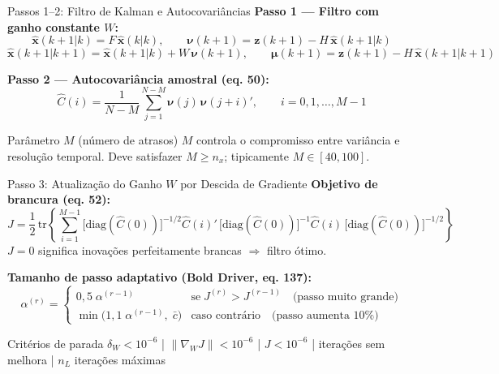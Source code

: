 \documentclass[aspectratio=169]{beamer}
\begin{document}
\begin{frame}{Passos 1--2: Filtro de Kalman e Autocovariâncias}
    \textbf{Passo 1 — Filtro com ganho constante $W$:}
    \[
        \hat{\mathbf{x}}(k{+}1|k) = F\,\hat{\mathbf{x}}(k|k), \qquad
        \boldsymbol{\nu}(k{+}1) = \mathbf{z}(k{+}1) - H\,\hat{\mathbf{x}}(k{+}1|k)
    \]
    \[
        \hat{\mathbf{x}}(k{+}1|k{+}1) = \hat{\mathbf{x}}(k{+}1|k) + W\,\boldsymbol{\nu}(k{+}1), \qquad
        \boldsymbol{\mu}(k{+}1) = \mathbf{z}(k{+}1) - H\,\hat{\mathbf{x}}(k{+}1|k{+}1)
    \]

    \vspace{0.3cm}
    \textbf{Passo 2 — Autocovariância amostral (eq. 50):}
    \[
        \hat{C}(i) = \frac{1}{N-M}\sum_{j=1}^{N-M}\boldsymbol{\nu}(j)\,\boldsymbol{\nu}(j{+}i)',
        \qquad i = 0,1,\ldots,M{-}1
    \]

    \begin{alertblock}{Parâmetro $M$ (número de atrasos)}
        $M$ controla o compromisso entre variância e resolução temporal.
        Deve satisfazer $M \geq n_x$; tipicamente $M \in [40, 100]$.
    \end{alertblock}
\end{frame}

\begin{frame}{Passo 3: Atualização do Ganho $W$ por Descida de Gradiente}
    \textbf{Objetivo de brancura (eq. 52):}
    \[
        J = \frac{1}{2}\,\text{tr}\!\left\{
            \sum_{i=1}^{M-1}
            \bigl[\text{diag}(\hat{C}(0))\bigr]^{-1/2}
            \hat{C}(i)'\,
            \bigl[\text{diag}(\hat{C}(0))\bigr]^{-1}
            \hat{C}(i)\,
            \bigl[\text{diag}(\hat{C}(0))\bigr]^{-1/2}
        \right\}
    \]
    $J = 0$ significa inovações perfeitamente brancas $\Rightarrow$ filtro ótimo.

    \vspace{0.2cm}
    \textbf{Tamanho de passo adaptativo (Bold Driver, eq. 137):}
    \[
        \alpha^{(r)} =
        \begin{cases}
            0{,}5\;\alpha^{(r-1)} & \text{se}\; J^{(r)} > J^{(r-1)}
                                     \quad\text{(passo muito grande)} \\
            \min\!\bigl(1{,}1\;\alpha^{(r-1)},\;\bar{c}\bigr)
                                  & \text{caso contrário}
                                     \quad\text{(passo aumenta 10\%)}
        \end{cases}
    \]

    \begin{block}{Critérios de parada}
        $\delta_W < 10^{-6}$ \;|\; $\|\nabla_W J\| < 10^{-6}$ \;|\;
        $J < 10^{-6}$ \;| iterações sem melhora \;|\; $n_L$ iterações máximas
    \end{block}
\end{frame}
\end{document}
